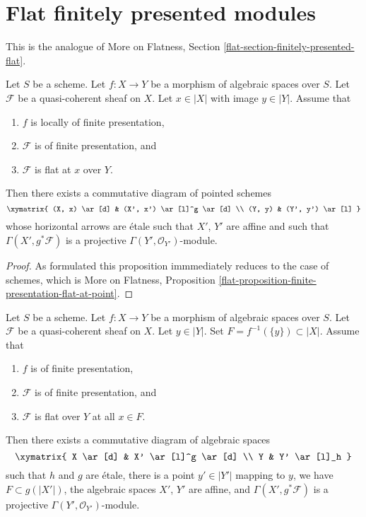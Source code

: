 \section{Flat finitely presented modules}
\label{section-finitely-presented-flat}

\noindent
This is the analogue of More on Flatness, Section
\ref{flat-section-finitely-presented-flat}.

\begin{proposition}
\label{proposition-finite-presentation-flat-at-point}
Let $S$ be a scheme.
Let $f : X \to Y$ be a morphism of algebraic spaces over $S$.
Let $\mathcal{F}$ be a quasi-coherent sheaf on $X$.
Let $x \in |X|$ with image $y \in |Y|$.
Assume that
\begin{enumerate}
\item $f$ is locally of finite presentation,
\item $\mathcal{F}$ is of finite presentation, and
\item $\mathcal{F}$ is flat at $x$ over $Y$.
\end{enumerate}
Then there exists a commutative diagram of pointed schemes
$$
\xymatrix{
(X, x) \ar[d] & (X', x') \ar[l]^g \ar[d] \\
(Y, y) & (Y', y') \ar[l]
}
$$
whose horizontal arrows are \'etale such that $X'$, $Y'$
are affine and such that
$\Gamma(X', g^*\mathcal{F})$ is a projective
$\Gamma(Y', \mathcal{O}_{Y'})$-module.
\end{proposition}

\begin{proof}
As formulated this proposition immmediately reduces
to the case of schemes, which is
More on Flatness, Proposition
\ref{flat-proposition-finite-presentation-flat-at-point}.
\end{proof}

\begin{lemma}
\label{lemma-finite-presentation-flat-along-fibre}
Let $S$ be a scheme.
Let $f : X \to Y$ be a morphism of algebraic spaces over $S$.
Let $\mathcal{F}$ be a quasi-coherent sheaf on $X$.
Let $y \in |Y|$. Set $F = f^{-1}(\{y\}) \subset |X|$. Assume that
\begin{enumerate}
\item $f$ is of finite presentation,
\item $\mathcal{F}$ is of finite presentation, and
\item $\mathcal{F}$ is flat over $Y$ at all $x \in F$.
\end{enumerate}
Then there exists a commutative diagram of algebraic spaces
$$
\xymatrix{
X \ar[d] & X' \ar[l]^g \ar[d] \\
Y & Y' \ar[l]_h
}
$$
such that $h$ and $g$ are \'etale, there is a point
$y' \in |Y'|$ mapping to $y$, we have $F \subset g(|X'|)$,
the algebraic spaces $X'$, $Y'$ are affine, and
$\Gamma(X', g^*\mathcal{F})$ is a projective
$\Gamma(Y', \mathcal{O}_{Y'})$-module.
\end{lemma}

